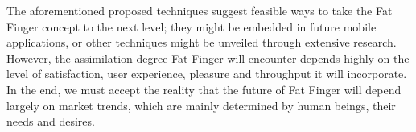 The aforementioned proposed techniques suggest feasible ways to take the Fat Finger concept to the next level; they might be embedded in future mobile applications, or other techniques might be unveiled through extensive research. 
However, the assimilation degree Fat Finger will encounter depends highly on the level of satisfaction, user experience, pleasure and throughput it will incorporate. In the end, we must accept the reality that the future of Fat Finger will depend largely on market trends, which are mainly determined by human beings, their needs and desires.
 




